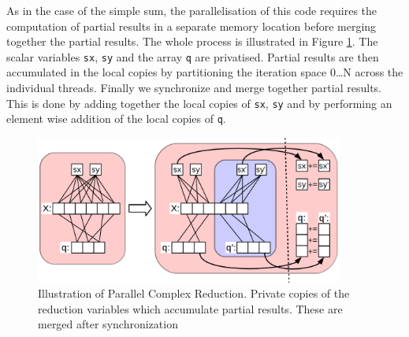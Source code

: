     As in the case of the simple sum, the parallelisation of this code
    requires the computation of partial results in a separate memory
    location before merging together the partial results.
    The whole process is illustrated in Figure \ref{nice-picture}.
    The scalar variables \texttt{sx}, \texttt{sy} and the array \texttt{q} are
    privatised.
    Partial results are then accumulated in the local copies by partitioning the
    iteration space 0{\dots}N across the individual threads. 
    Finally we synchronize and  merge together partial
    results.  This is done by adding together the local copies
    of \texttt{sx}, \texttt{sy} and by performing an element wise addition
    of the local copies of \texttt{q}. 

\begin{figure}[h]
\centering
\includegraphics[width=0.9\textwidth]{figures/nicepicture.png}
\caption{Illustration of Parallel Complex Reduction. Private copies of the reduction variables which accumulate partial results. These are merged after synchronization}
\label{nice-picture}
\end{figure}


